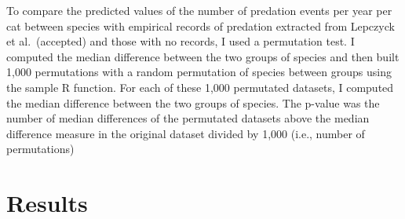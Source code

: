\documentclass[
  super,
  review,
  3p]{elsarticle}
\begin{document}
To compare the predicted values of the number of predation events per
year per cat between species with empirical records of predation
extracted from Lepczyck et al.~(accepted) and those with no records, I
used a permutation test. I computed the median difference between the
two groups of species and then built 1,000 permutations with a random
permutation of species between groups using the sample R function. For
each of these 1,000 permutated datasets, I computed the median
difference between the two groups of species. The p-value was the number
of median differences of the permutated datasets above the median
difference measure in the original dataset divided by 1,000 (i.e.,
number of permutations)

\hypertarget{results}{%
\section{\texorpdfstring{\textbf{Results}}{Results}}\label{results}}
\end{document}
